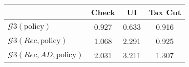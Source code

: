 \begin{tabular}{@{}lccc@{}} 
\toprule 
                          & Check      & UI    & Tax Cut    \\  \midrule 
$\mathcal{G}3(\text{policy})$ & 0.927  & 0.633  & 0.916     \\ 
$\mathcal{G}3(Rec,\text{policy})$ & 1.068  & 2.291  & 0.925     \\ 
$\mathcal{G}3(Rec, AD,\text{policy})$ & 2.031  & 3.211  & 1.307     \\ 
\end{tabular}  
